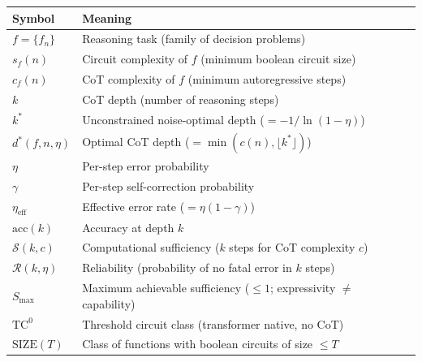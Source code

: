 \documentclass{article}
\theoremstyle{definition}
\theoremstyle{remark}
\providecommand{\TC}{\mathrm{TC}^0}
\newcommand{\depth}{d^*}       %
\newcommand{\noise}{\eta}      %
\newcommand{\neff}{\noise_{\mathrm{eff}}} %
\newcommand{\acc}{\mathrm{acc}} %
\newcommand{\suf}{\mathcal{S}} %
\newcommand{\rel}{\mathcal{R}} %
\newcommand{\ccot}{c}          %
\newcommand{\Smax}{S_{\max}}   %
\newcommand{\SIZE}{\mathrm{SIZE}}
\begin{document}
\begin{table}[h]
\centering
\begin{tabular}{ll}
\toprule
\textbf{Symbol} & \textbf{Meaning} \\
\midrule
$f = \{f_n\}$ & Reasoning task (family of decision problems) \\
$s_f(n)$ & Circuit complexity of $f$ (minimum boolean circuit size) \\
$\ccot_f(n)$ & CoT complexity of $f$ (minimum autoregressive steps) \\
$k$ & CoT depth (number of reasoning steps) \\
$k^*$ & Unconstrained noise-optimal depth ($= -1/\!\ln(1-\noise)$) \\
$\depth(f, n, \noise)$ & Optimal CoT depth ($= \min(\ccot(n), \lfloor k^* \rfloor)$) \\
$\noise$ & Per-step error probability \\
$\gamma$ & Per-step self-correction probability \\
$\neff$ & Effective error rate ($= \noise(1-\gamma)$) \\
$\acc(k)$ & Accuracy at depth $k$ \\
$\suf(k, c)$ & Computational sufficiency ($k$ steps for CoT complexity $c$) \\
$\rel(k, \noise)$ & Reliability (probability of no fatal error in $k$ steps) \\
$\Smax$ & Maximum achievable sufficiency ($\leq 1$; expressivity $\neq$ capability) \\
$\TC$ & Threshold circuit class (transformer native, no CoT) \\
$\SIZE(T)$ & Class of functions with boolean circuits of size $\leq T$ \\
\bottomrule
\end{tabular}
\end{table}
\end{document}
